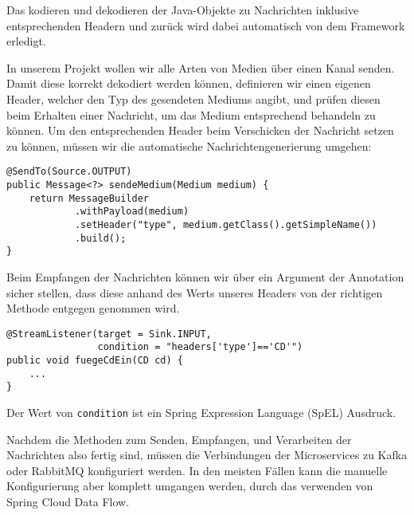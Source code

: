 \documentclass{article}
\begin{document}
Das kodieren und dekodieren der Java-Objekte zu Nachrichten inklusive entsprechenden Headern und zurück wird dabei automatisch von dem Framework erledigt.

In unserem Projekt wollen wir alle Arten von Medien über einen Kanal senden.
Damit diese korrekt dekodiert werden können, definieren wir einen eigenen Header, welcher den Typ des gesendeten Mediums angibt, und prüfen diesen beim Erhalten einer Nachricht, um das Medium entsprechend behandeln zu können.
Um den entsprechenden Header beim Verschicken der Nachricht setzen zu können, müssen wir die automatische Nachrichtengenerierung umgehen:
\begin{lstlisting}
@SendTo(Source.OUTPUT)
public Message<?> sendeMedium(Medium medium) {
    return MessageBuilder
            .withPayload(medium)
            .setHeader("type", medium.getClass().getSimpleName())
            .build();
}
\end{lstlisting}

Beim Empfangen der Nachrichten können wir über ein Argument der Annotation sicher stellen, dass diese anhand des Werts unseres Headers von der richtigen Methode entgegen genommen wird.
\begin{lstlisting}
@StreamListener(target = Sink.INPUT,
                condition = "headers['type']=='CD'")
public void fuegeCdEin(CD cd) {
    ...
}
\end{lstlisting}

Der Wert von \texttt{condition} ist ein Spring Expression Language (SpEL) Ausdruck.

Nachdem die Methoden zum Senden, Empfangen, und Verarbeiten der Nachrichten also fertig sind, müssen die Verbindungen der Microservices zu Kafka oder RabbitMQ konfiguriert werden.
In den meisten Fällen kann die manuelle Konfigurierung aber komplett umgangen werden, durch das verwenden von Spring Cloud Data Flow.
\end{document}
